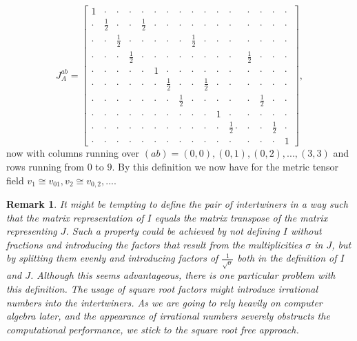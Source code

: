 \documentclass[a4paper,12pt, DIV=14, BCOR=5mm, twoside, headsepline, numbers=noenddot]{scrbook}
\newtheorem*{remark}{Remark}
\begin{document}
\begin{equation}\label{interJMet}
J^{ab}_{A} = \begin{bmatrix} 
                1 & \cdot & \cdot & \cdot & \cdot & \cdot & \cdot & \cdot & \cdot & \cdot & \cdot & \cdot & \cdot & \cdot & \cdot & \cdot \\
                \cdot & \frac{1}{2} & \cdot & \cdot & \frac{1}{2} & \cdot & \cdot & \cdot & \cdot & \cdot & \cdot & \cdot & \cdot & \cdot & \cdot & \cdot  \\
                \cdot & \cdot & \frac{1}{2} & \cdot & \cdot & \cdot & \cdot & \cdot & \frac{1}{2} & \cdot & \cdot & \cdot & \cdot & \cdot & \cdot & \cdot  \\
                \cdot & \cdot & \cdot & \frac{1}{2} & \cdot & \cdot & \cdot & \cdot & \cdot & \cdot & \cdot & \cdot & \frac{1}{2} & \cdot & \cdot & \cdot  \\
                \cdot & \cdot & \cdot & \cdot & \cdot & 1 & \cdot & \cdot & \cdot & \cdot & \cdot & \cdot & \cdot & \cdot & \cdot & \cdot  \\
                \cdot & \cdot & \cdot & \cdot & \cdot & \cdot & \frac{1}{2} & \cdot & \cdot & \frac{1}{2} & \cdot & \cdot & \cdot & \cdot & \cdot & \cdot  \\
                \cdot & \cdot & \cdot & \cdot & \cdot & \cdot & \cdot & \frac{1}{2} & \cdot & \cdot & \cdot & \cdot & \cdot & \frac{1}{2} & \cdot & \cdot  \\
                \cdot & \cdot & \cdot & \cdot & \cdot & \cdot & \cdot & \cdot & \cdot & \cdot & 1 & \cdot & \cdot & \cdot & \cdot & \cdot  \\
                \cdot & \cdot & \cdot & \cdot & \cdot & \cdot & \cdot & \cdot & \cdot & \cdot & \cdot & \frac{1}{2} \cdot & \cdot & \cdot & \frac{1}{2} & \cdot  \\
                \cdot & \cdot & \cdot & \cdot & \cdot & \cdot & \cdot & \cdot & \cdot & \cdot & \cdot & \cdot & \cdot & \cdot & \cdot & 1  
            \end{bmatrix},
\end{equation}
now with columns running over $(ab)={(0,0),(0,1),(0,2),...,(3,3)}$ and rows running from $0$ to $9$. By this definition we now have for the metric tensor field $v_1 \cong v_{01}, v_2 \cong v_{0,2},...$.
\begin{remark}
It might be tempting to define the pair of intertwiners in a way such that the matrix representation of $I$ equals the matrix transpose of the matrix representing $J$. Such a property could be achieved by not defining $I$ without fractions and introducing the factors that result from the multiplicities $\sigma$ in $J$, but by splitting them evenly and introducing factors of $\frac{1}{\sqrt{\sigma}}$ both in the definition of $I$ and $J$. Although this seems advantageous, there is one particular problem with this definition. The usage of square root factors might introduce irrational numbers into the intertwiners. As we are going to rely heavily on computer algebra later, and the appearance of irrational numbers severely obstructs the computational performance, we stick to the square root free approach.  
\end{remark}
\end{document}
